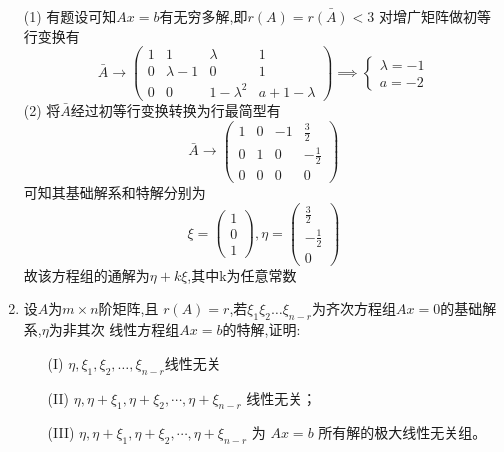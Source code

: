 \documentclass[12pt, a4paper, oneside, UTF8]{ctexbook}
\begin{document}
\begin{enumerate}
    \begin{solution}
    (1) 有题设可知$Ax=b$有无穷多解,即$r(A)=r{\bar{(A)}}<3$ 对增广矩阵做初等行变换有 
    $$
    \bar{A}\rightarrow \begin{pmatrix}
        1 & 1 & \lambda & 1 \\
        0 & \lambda -1 & 0 & 1 \\
        0 & 0 & 1-\lambda^2 & a+1-\lambda
    \end{pmatrix} \implies \begin{cases}
        \lambda = -1\\
        a = -2
    \end{cases}
    $$
    (2) 将$\bar{A}$经过初等行变换转换为行最简型有 
    $$
    \bar{A}\rightarrow\begin{pmatrix}
        1 & 0 & -1 & \frac{3}{2} \\
        0 & 1 & 0 & -\frac{1}{2} \\
        0 & 0 & 0 & 0
    \end{pmatrix}
    $$
    可知其基础解系和特解分别为 
    $$
    \xi=\begin{pmatrix}
        1 \\
        0 \\
        1
    \end{pmatrix}, \eta = \begin{pmatrix}
        \frac{3}{2} \\
        -\frac{1}{2} \\
        0
    \end{pmatrix}
    $$ 故该方程组的通解为$\eta+k\xi$,其中k为任意常数 
    \end{solution}
    
    \item 设$A$为$m\times n$阶矩阵,且 $r(A)=r$,若$\xi_1\xi_2\ldots\xi_{n-r}$为齐次方程组$Ax=0$的基础解系,$\eta$为非其次
    线性方程组$Ax=b$的特解,证明:
    \begin{enumerate}
        \item [(I)] $\eta,\xi_1,\xi_2,\ldots,\xi_{n-r}$线性无关
        \item [(II)] $\eta, \eta + \xi_1, \eta + \xi_2, \cdots, \eta + \xi_{n-r}$ 线性无关；
        \item [(III)] $\eta, \eta + \xi_1, \eta + \xi_2, \cdots, \eta + \xi_{n-r}$ 为 $Ax = b$ 所有解的极大线性无关组。
    \end{enumerate}
    

\end{enumerate}
\end{document}
